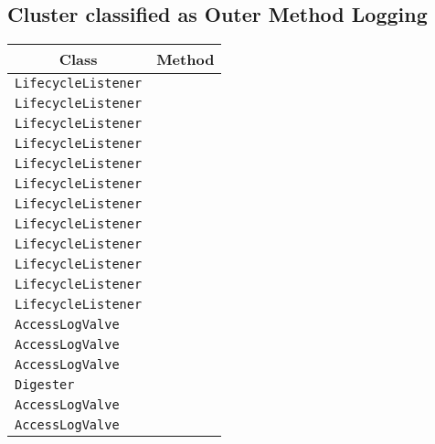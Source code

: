 \subsection{Cluster classified as Outer Method Logging}

\begin{center}
\begin{tabular}{ll}\toprule
\multicolumn{1}{c}{Class}&\multicolumn{1}{c}{Method}\\\midrule
\lstinline/LifecycleListener/&\raisebox{0pt}{\lstinline/log()/}\\ 
\lstinline/LifecycleListener/&\raisebox{0pt}{\lstinline/log()/}\\ 
\lstinline/LifecycleListener/&\raisebox{0pt}{\lstinline/log()/}\\ 
\lstinline/LifecycleListener/&\raisebox{0pt}{\lstinline/log()/}\\ 
\lstinline/LifecycleListener/&\raisebox{0pt}{\lstinline/log()/}\\ 
\lstinline/LifecycleListener/&\raisebox{0pt}{\lstinline/log()/}\\ 
\lstinline/LifecycleListener/&\raisebox{0pt}{\lstinline/log()/}\\ 
\lstinline/LifecycleListener/&\raisebox{0pt}{\lstinline/log()/}\\ 
\lstinline/LifecycleListener/&\raisebox{0pt}{\lstinline/log()/}\\ 
\lstinline/LifecycleListener/&\raisebox{0pt}{\lstinline/log()/}\\ 
\lstinline/LifecycleListener/&\raisebox{0pt}{\lstinline/log()/}\\ 
\lstinline/LifecycleListener/&\raisebox{0pt}{\lstinline/initializeSSL()throwsException/}\\ 
\lstinline/AccessLogValve/&\raisebox{0pt}{\lstinline/getServletRequestElement(String)/}\\ 
\lstinline/AccessLogValve/&\raisebox{0pt}{\lstinline/getServletRequestElement(String)/}\\ 
\lstinline/AccessLogValve/&\raisebox{0pt}{\lstinline/getServletRequestElement(String)/}\\ 
\lstinline/Digester/&\raisebox{0pt}{\lstinline/SAXExceptioncreateSAXException(String,Exception)/}\\ 
\lstinline/AccessLogValve/&\raisebox{0pt}{\lstinline/getServletRequestElement(String)/}\\ 
\lstinline/AccessLogValve/&\raisebox{0pt}{\lstinline/getServletRequestElement(String)/}\\ 

\end{tabular}
\end{center}
